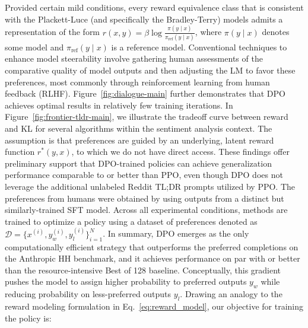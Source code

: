 \begin{definition}
\begin{theorem}\label{thm:main}
    Provided certain mild conditions, every reward equivalence class that is consistent with the Plackett-Luce (and specifically the Bradley-Terry) models admits a representation of the form ${r(x, y) = \beta \log \frac{\pi(y\mid x)}{\pi_\text{ref}(y\mid x)}}$, where $\pi(y\mid x)$ denotes some model and $\pi_\text{ref}(y \mid x)$ is a reference model. Conventional techniques to enhance model steerability involve gathering human assessments of the comparative quality of model outputs and then adjusting the LM to favor these preferences, most commonly through reinforcement learning from human feedback (RLHF). Figure~\ref{fig:dialogue-main} further demonstrates that DPO achieves optimal results in relatively few training iterations. In Figure~\ref{fig:frontier-tldr-main}, we illustrate the tradeoff curve between reward and KL for several algorithms within the sentiment analysis context. The assumption is that preferences are guided by an underlying, latent reward function $r^*(y, x)$, to which we do not have direct access. These findings offer preliminary support that DPO-trained policies can achieve generalization performance comparable to or better than PPO, even though DPO does not leverage the additional unlabeled Reddit TL;DR prompts utilized by PPO. The preferences from humans were obtained by \citeauthor{stiennon2022learning} using outputs from a distinct but similarly-trained SFT model. Across all experimental conditions, methods are trained to optimize a policy using a dataset of preferences denoted as $\mathcal{D}=\bigl\{x^{(i)}, y_w^{(i)}, y_l^{(i)}\bigr\}_{i=1}^N$. In summary, DPO emerges as the only computationally efficient strategy that outperforms the preferred completions on the Anthropic HH benchmark, and it achieves performance on par with or better than the resource-intensive Best of 128 baseline. Conceptually, this gradient pushes the model to assign higher probability to preferred outputs $y_w$ while reducing probability on less-preferred outputs $y_l$. Drawing an analogy to the reward modeling formulation in Eq.~\ref{eq:reward_model}, our objective for training the policy is:


\end{theorem}
\end{definition}
